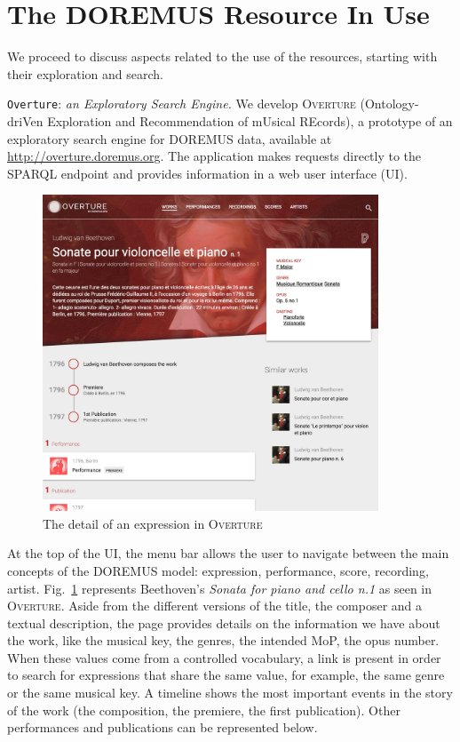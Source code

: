 \section{The DOREMUS Resource In Use} \label{sec:use}
We proceed to discuss aspects related to the use of the resources, starting with their exploration and search.

{\texttt{Overture}: {\it an Exploratory Search Engine.}} We develop \textsc{Overture} (Ontology-driVen Exploration and Recommendation of mUsical REcords), a prototype of an exploratory search engine for DOREMUS data, available at \url{http://overture.doremus.org}. The application makes requests directly to the SPARQL endpoint and provides information in a web user interface (UI).

\begin{figure}[t]
 \centerline{
 \includegraphics[width=10cm]{img/overture-sonata.jpg}}
 \caption{The detail of an expression in \textsc{Overture}}
 \label{fig:overture-detail}
\end{figure}

At the top of the UI, the menu bar allows the user to navigate between the main concepts of the DOREMUS model: expression, performance, score, recording, artist. Fig.~\ref{fig:overture-detail} represents Beethoven's \textit{Sonata for piano and cello n.1} as seen in \textsc{Overture}. Aside from the different versions of the title, the composer and a textual description, the page provides details on the information we have about the work, like the musical key, the genres, the intended MoP, the opus number. When these values come from a controlled vocabulary, a link is present in order to search for expressions that share the same value, for example, the same genre or the same musical key. A timeline shows the most important events in the story of the work (the composition, the premiere, the first publication). Other performances and publications can be represented below. 

